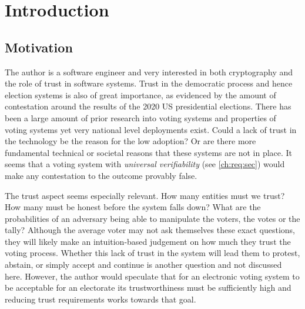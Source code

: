 \chapter{Introduction}
\label{ch:intro}


\section{Motivation}
\label{ch:intro:motiv}

The author is a software engineer and very interested in both cryptography and the role of trust in software systems. Trust in the democratic process and hence election systems is also of great importance, as evidenced by the amount of contestation around the results of the 2020 US presidential elections. There has been a large amount of prior research into voting systems \cite{
    panjaSecureEndtoendVerifiable2018,
    mccorrySmartContractBoardroom2017,
    liuEvotingProtocolBased2017,
    yangBlockchainVotingPublicly2020,
    spadaforaCoercionResistantBlockchainBasedEVoting2020,
    dimtiriouEfficientCoercionfreeUniversally2019,
    tsoukalasHeliosZeus2013,
    xiaVersatilePretVoter2010,
    ryanPrEtVoterVoterVerifiable2010,
    yuPlatformindependentSecureBlockchainBased2018,
    seifelnasrScalableOpenVoteNetwork2020,
    gajekTrustlessCensorshipResilientScalable2019,
    chillottiHomomorphicLWEBased} and properties of voting systems yet very national level deployments exist. Could a lack of trust in the technology be the reason for the low adoption? Or are there more fundamental technical or societal reasons that these systems are not in place. It seems that a voting system with \emph{universal verifiability} (see \autoref{ch:req:sec}) would make any contestation to the outcome provably false.

The trust aspect seems especially relevant. How many entities must we trust? How many must be honest before the system falls down? What are the probabilities of an adversary being able to manipulate the voters, the votes or the tally? Although the average voter may not ask themselves these exact questions, they will likely make an intuition-based judgement on how much they trust the voting process. Whether this lack of trust in the system will lead them to protest, abstain, or simply accept and continue is another question and not discussed here. However, the author would speculate that for an electronic voting system to be acceptable for an electorate its trustworthiness must be sufficiently high and reducing trust requirements works towards that goal.

